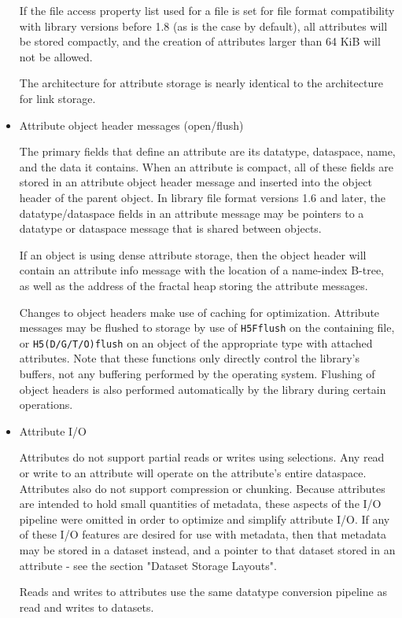 \begin{itemize}
If the file access property list used for a file is set for file format compatibility with library versions before 1.8 (as is the case by default), all attributes will be stored compactly, and the creation of attributes larger than 64 KiB will not be allowed.

The architecture for attribute storage is nearly identical to the architecture for link storage.

    \item Attribute object header messages (open/flush)

The primary fields that define an attribute are its datatype, dataspace, name, and the data it contains. When an attribute is compact, all of these fields are stored in an attribute object header message and inserted into the object header of the parent object. In library file format versions 1.6 and later, the datatype/dataspace fields in an attribute message may be pointers to a datatype or dataspace message that is shared between objects.

If an object is using dense attribute storage, then the object header will contain an attribute info message with the location of a name-index B-tree, as well as the address of the fractal heap storing the attribute messages.

Changes to object headers make use of caching for optimization. Attribute messages may be flushed to storage by use of \texttt{H5Fflush} on the containing file, or \texttt{H5(D/G/T/O)flush} on an object of the appropriate type with attached attributes. Note that these functions only directly control the library's buffers, not any buffering performed by the operating system. Flushing of object headers is also performed automatically by the library during certain operations.

    \item Attribute I/O

Attributes do not support partial reads or writes using selections. Any read or write to an attribute will operate on the attribute's entire dataspace. Attributes also do not support compression or chunking. Because attributes are intended to hold small quantities of metadata, these aspects of the I/O pipeline were omitted in order to optimize and simplify attribute I/O. If any of these I/O features are desired for use with metadata, then that metadata may be stored in a dataset instead, and a pointer to that dataset stored in an attribute - see the section "Dataset Storage Layouts".

Reads and writes to attributes use the same datatype conversion pipeline as read and writes to datasets.


\end{itemize}
